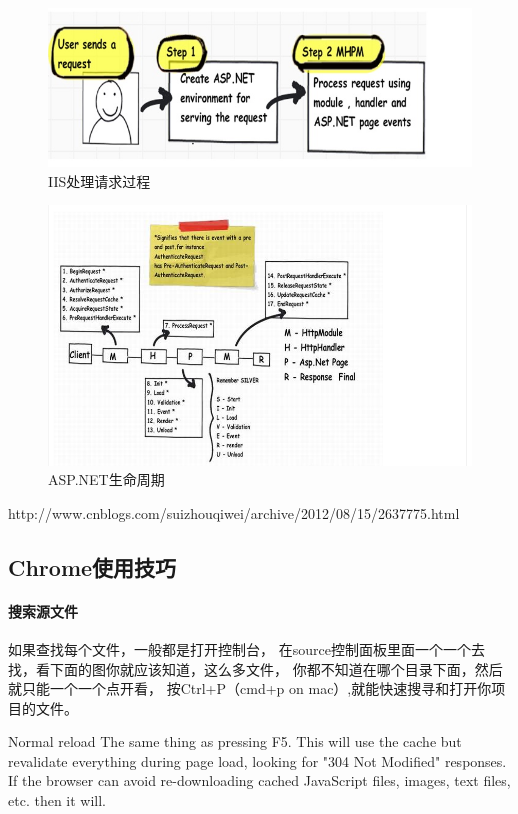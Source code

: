 \documentclass{book}
\begin{document}
\begin{figure}[htbp]
	\centering
	\includegraphics[scale=0.8]{IISHandleUserRequest.png}
	\caption{IIS处理请求过程}
	\label{fig:IISHandleUserRequest}
\end{figure}

\begin{figure}[htbp]
	\centering
	\includegraphics[scale=0.8]{TheWholeLifeCycleOfHttp.png}
	\caption{ASP.NET生命周期}
	\label{fig:TheWholeLifeCycleOfHttp}
\end{figure}
http://www.cnblogs.com/suizhouqiwei/archive/2012/08/15/2637775.html

\subsection{Chrome使用技巧}

\paragraph{搜索源文件}
如果查找每个文件，一般都是打开控制台，
在source控制面板里面一个一个去找，看下面的图你就应该知道，这么多文件，
你都不知道在哪个目录下面，然后就只能一个一个点开看，
按Ctrl+P（cmd+p on mac）,就能快速搜寻和打开你项目的文件。

Normal reload
The same thing as pressing F5. This will use the cache but revalidate everything during page load, looking for "304 Not Modified" responses. If the browser can avoid re-downloading cached JavaScript files, images, text files, etc. then it will.
\end{document}
